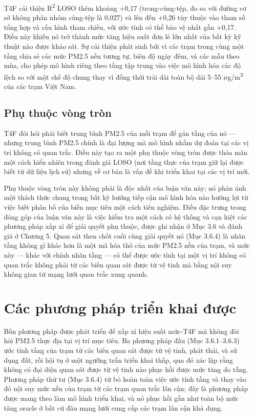 T4F cải thiện R\textsuperscript{2} LOSO thêm khoảng +0,17 (trong-cùng-tệp, đo so với đường cơ sở không phân nhóm cùng-tệp là 0,027) và lên đến +0,26 tùy thuộc vào tham số tổng hợp và cấu hình tham chiếu, với ước tính có thể bảo vệ nhất gần +0,17. Điều này khiến nó trở thành mức tăng hiệu suất đơn lẻ lớn nhất của bất kỳ kỹ thuật nào được khảo sát. Sự cải thiện phát sinh bởi vì các trạm trong cùng một tầng chia sẻ các mức PM2.5 nền tương tự, biên độ ngày đêm, và các mẫu theo mùa, cho phép mô hình riêng theo tầng tập trung vào việc mô hình hóa các độ lệch so với một chế độ chung thay vì đồng thời trải dài toàn bộ dải 5--55 $\mu$g/m\textsuperscript{3} của các trạm Việt Nam.

\subsection{Phụ thuộc vòng tròn}

T4F đòi hỏi phải biết trung bình PM2.5 của mỗi trạm để gán tầng của nó --- nhưng trung bình PM2.5 chính là đại lượng mà mô hình nhắm dự đoán tại các vị trí không có quan trắc. Điều này tạo ra một phụ thuộc vòng tròn được thỏa mãn một cách hiển nhiên trong đánh giá LOSO (nơi tầng thực của trạm giữ lại được biết từ dữ liệu lịch sử) nhưng về cơ bản là vấn đề khi triển khai tại các vị trí mới.

Phụ thuộc vòng tròn này không phải là độc nhất của luận văn này; nó phản ánh một thách thức chung trong bất kỳ hướng tiếp cận mô hình hóa nào hưởng lợi từ việc biết phân bố của biến mục tiêu một cách tiên nghiệm. Điều đặc trưng trong đóng góp của luận văn này là việc kiểm tra một cách có hệ thống và cạn kiệt các phương pháp xấp xỉ để giải quyết phụ thuộc, được ghi nhận ở Mục 3.6 và đánh giá ở Chương 5. Quan sát then chốt cuối cùng giải quyết nó (Mục 3.6.4) là nhãn tầng không gì khác hơn là một mã hóa thô của mức PM2.5 nền của trạm, và mức này --- khác với chính nhãn tầng --- có thể được ước tính tại một vị trí không có quan trắc không phải từ các biến quan sát được từ vệ tinh mà bằng nội suy không gian từ mạng lưới quan trắc xung quanh.


\section{Các phương pháp triển khai được}

Bốn phương pháp được phát triển để xấp xỉ hiệu suất mức-T4F mà không đòi hỏi PM2.5 thực địa tại vị trí mục tiêu. Ba phương pháp đầu (Mục 3.6.1--3.6.3) ước tính tầng của trạm từ các biến quan sát được từ vệ tinh, phát thải, và sử dụng đất, rồi hội tụ ở một ngưỡng trần triển khai thấp, qua đó xác lập rằng không có đại diện quan sát được từ vệ tinh nào phục hồi được mức tăng do tầng. Phương pháp thứ tư (Mục 3.6.4) từ bỏ hoàn toàn việc ước tính tầng và thay vào đó nội suy mức nền của trạm từ các trạm quan trắc lân cận; đây là phương pháp được mang theo làm mô hình triển khai, và nó phục hồi gần như toàn bộ mức tăng oracle ở bất cứ đâu mạng lưới cung cấp các trạm lân cận khả dụng.

